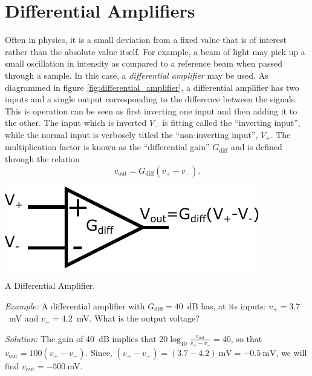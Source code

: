 \documentclass{tufte-book}
\begin{document}
\section{Differential Amplifiers}
\label{sec:diff_amps}
Often in physics, it is a small deviation from a fixed value that is of interest rather than the absolute value itself. For example, a beam of light may pick up a small oscillation in intensity as compared to a reference beam when passed through a sample. In this case, a \textit{differential amplifier} may be used. As diagrammed in figure \ref{fig:differential_amplifier}, a differential amplifier has two inputs and a single output corresponding to the difference between the signals. This is operation can be seen as first inverting one input and then adding it to the other. The input which is inverted $V_-$ is fitting called the ``inverting input'', while the normal input is verbosely titled the ``non-inverting input'', $V_+$. The multiplication factor is known as the ``differential gain'' $G_\text{diff}$ and is defined through the relation
\begin{equation}
\label{eq:def_diff_amp}
v_\text{out} = G_\text{diff}\left(v_+-v_-\right).
\end{equation}


\begin{marginfigure}%
  \includegraphics[width=\linewidth]{differential_amplifier}
  \caption{A Differential Amplifier.}
  \label{fig:differential_amplifier}
\end{marginfigure}


\textit{Example:} A differential amplifier with $G_\text{diff} = 40$~dB has, at its inputs: $v_+ = 3.7$~mV and $v_- = 4.2$~mV. What is the output voltage?

\textit{Solution:} The gain of 40~dB implies that $20\log_{10}\frac{v_\text{out}}{v_+-v_-} = 40$, so that $v_\text{out} = 100\left(v_+-v_-\right)$. Since, $\left(v_+-v_-\right) = \left(3.7-4.2\right)~\text{mV} = -0.5~\text{mV}$, we will find $v_\text{out} = -500~$mV.
\end{document}
